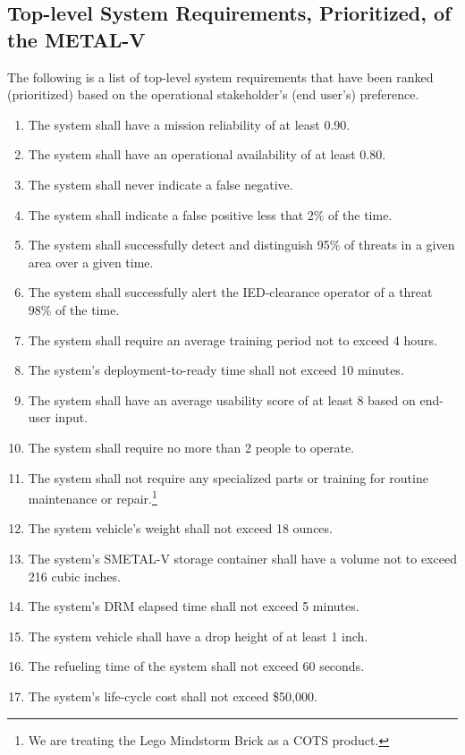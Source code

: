 \documentclass[letterpaper,10pt]{article}
\begin{document}
\subsection{Top-level System Requirements, Prioritized, of the METAL-V}
The following is a list of top-level system requirements that have been ranked (prioritized) based on the operational stakeholder's (end user's) preference.
\begin{enumerate}
	\item The system shall have a mission reliability of at least 0.90.
	\item The system shall have an operational availability of at least 0.80.
	\item The system shall never indicate a false negative.
	\item The system shall indicate a false positive less that 2\% of the time.
	\item The system shall successfully detect and distinguish 95\% of threats in a given area over a given time.
	\item The system shall successfully alert the IED-clearance operator of a threat 98\% of the time.
	\item The system shall require an average training period not to exceed 4 hours.
	\item The system's deployment-to-ready time shall not exceed 10 minutes.
	\item The system shall have an average usability score of at least 8 based on end-user input.
	\item The system shall require no more than 2 people to operate.
	\item The system shall not require any specialized parts or training for routine maintenance or repair.\footnote{We are treating the Lego Mindstorm Brick as a COTS product.}
	\item The system vehicle's weight shall not exceed 18 ounces.
	\item The system’s SMETAL-V storage container shall have a volume not to exceed 216 cubic inches.
	\item The system's DRM elapsed time shall not exceed 5 minutes.
	\item The system vehicle shall have a drop height of at least 1 inch.
	\item The refueling time of the system shall not exceed 60 seconds.
	\item The system's life-cycle cost shall not exceed \$50,000.
\end{enumerate}
\end{document}
